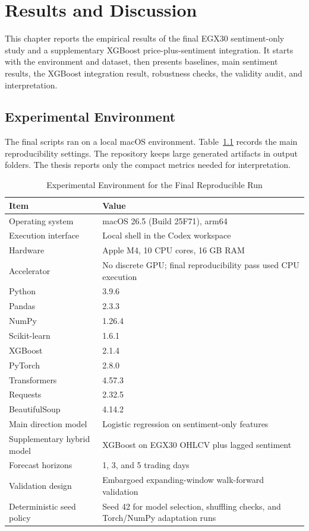 \chapter{Results and Discussion}
\label{chap:results}

This chapter reports the empirical results of the final EGX30 sentiment-only study and a supplementary XGBoost price-plus-sentiment integration. It starts with the environment and dataset, then presents baselines, main sentiment results, the XGBoost integration result, robustness checks, the validity audit, and interpretation.

\section{Experimental Environment}

The final scripts ran on a local macOS environment. Table~\ref{tab:environment} records the main reproducibility settings. The repository keeps large generated artifacts in output folders. The thesis reports only the compact metrics needed for interpretation.

\begin{table}[ht]
\centering
\caption{Experimental Environment for the Final Reproducible Run}
\label{tab:environment}
\small
\begin{tabularx}{\textwidth}{p{4.0cm}X}
\toprule
Item & Value \\
\midrule
Operating system & macOS 26.5 (Build 25F71), arm64 \\
Execution interface & Local shell in the Codex workspace \\
Hardware & Apple M4, 10 CPU cores, 16 GB RAM \\
Accelerator & No discrete GPU; final reproducibility pass used CPU execution \\
Python & 3.9.6 \\
Pandas & 2.3.3 \\
NumPy & 1.26.4 \\
Scikit-learn & 1.6.1 \\
XGBoost & 2.1.4 \\
PyTorch & 2.8.0 \\
Transformers & 4.57.3 \\
Requests & 2.32.5 \\
BeautifulSoup & 4.14.2 \\
Main direction model & Logistic regression on sentiment-only features \\
Supplementary hybrid model & XGBoost on EGX30 OHLCV plus lagged sentiment \\
Forecast horizons & 1, 3, and 5 trading days \\
Validation design & Embargoed expanding-window walk-forward validation \\
Deterministic seed policy & Seed 42 for model selection, shuffling checks, and Torch/NumPy adaptation runs \\
\bottomrule
\end{tabularx}
\end{table}

